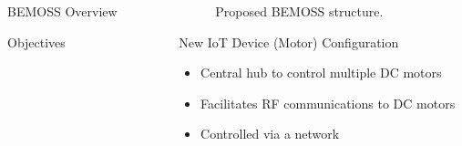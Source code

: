 \documentclass[final]{beamer}
\newlength{\sepwid}
\newlength{\onecolwid}
\begin{document}
\begin{frame}[t]
\begin{columns}[t]
\begin{column}{\onecolwid}
\begin{block}{BEMOSS Overview}
\begin{alertblock}{Objectives}
\vskip -0.75cm

\end{alertblock}

\vskip -2cm
\end{block}

\end{column} %

\begin{column}{\sepwid}\end{column} %

\begin{column}{\onecolwid} %


\begin{figure}
    \centering
    \label{fig:MotorCircuit}
    \caption{Proposed BEMOSS structure.}
    \end{figure}
\begin{block}{New IoT Device (Motor) Configuration}
\vskip -0.5cm
\begin{itemize}
 
        \item Central hub to control multiple DC motors 
        \item Facilitates RF communications to DC motors
        \item Controlled via a network 


\end{itemize}
\end{block}
\end{column}
\end{columns}
\end{frame}
\end{document}
